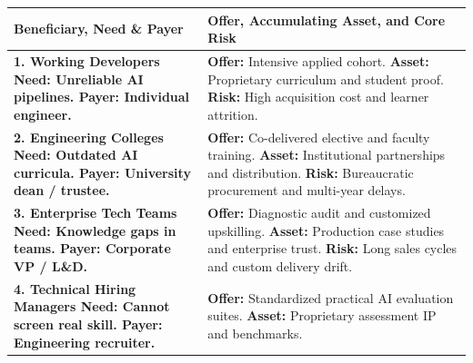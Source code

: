 \begin{table}[htbp]
\centering
\begin{tcolorbox}[
  enhanced,
  colback=white,
  colframe=BayesBorder!80!white,
  boxrule=0.4pt,
  arc=2pt,
  left=3pt,right=3pt,top=3pt,bottom=3pt,
  before skip=3pt,after skip=4pt
]
\scriptsize
\setlength{\tabcolsep}{3pt}
\renewcommand{\arraystretch}{1.18}
\begin{tabularx}{\linewidth}{@{} >{\bfseries\color{BayesInk}}p{2.3cm} >{\color{BayesInk}}X @{}}
\toprule
\textbf{Beneficiary, Need \& Payer} & \textbf{Offer, Accumulating Asset, and Core Risk} \\
\midrule
1. Working Developers\newline
\textbf{Need:} Unreliable AI pipelines.\newline
\textbf{Payer:} Individual engineer. & 
\textbf{Offer:} Intensive applied cohort.\newline
\textbf{Asset:} Proprietary curriculum and student proof.\newline
\textbf{Risk:} High acquisition cost and learner attrition. \\
\midrule
2. Engineering Colleges\newline
\textbf{Need:} Outdated AI curricula.\newline
\textbf{Payer:} University dean / trustee. & 
\textbf{Offer:} Co-delivered elective and faculty training.\newline
\textbf{Asset:} Institutional partnerships and distribution.\newline
\textbf{Risk:} Bureaucratic procurement and multi-year delays. \\
\midrule
3. Enterprise Tech Teams\newline
\textbf{Need:} Knowledge gaps in teams.\newline
\textbf{Payer:} Corporate VP / L\&D. & 
\textbf{Offer:} Diagnostic audit and customized upskilling.\newline
\textbf{Asset:} Production case studies and enterprise trust.\newline
\textbf{Risk:} Long sales cycles and custom delivery drift. \\
\midrule
4. Technical Hiring Managers\newline
\textbf{Need:} Cannot screen real skill.\newline
\textbf{Payer:} Engineering recruiter. & 
\textbf{Offer:} Standardized practical AI evaluation suites.\newline
\textbf{Asset:} Proprietary assessment IP and benchmarks.\newline

\end{tabularx}
\end{tcolorbox}
\end{table}
